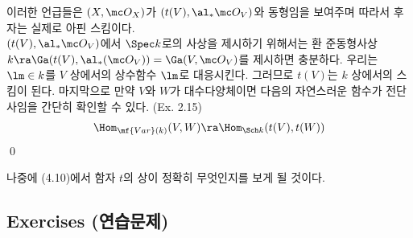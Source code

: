 \begin{proposition}
{		이러한 언급들은 $(X,\mc O_X)$가 $(t(V),\al_*\mc O_V)$와 동형임을 보여주며 따라서 후자는 실제로 아핀 스킴이다.\\
		$(t(V),\al_*\mc O_V)$에서 $\Spec k$로의 사상을 제시하기 위해서는 환 준동형사상
		$k\ra\Ga(t(V),\al_*(\mc O_V))=\Ga(V,\mc O_V)$를 제시하면 충분하다.
		우리는 $\lm\in k$를 $V$ 상에서의 상수함수 $\lm$로 대응시킨다. 그러므로 $t(V)$는 $k$ 상에서의 스킴이 된다.
		마지막으로 만약 $V$와 $W$가 대수다양체이면 다음의 자연스러운 함수가 전단사임을 간단히 확인할 수 있다. (Ex. 2.15)}
		$$\Hom_{\mf{Var}(k)}(V,W)\ra\Hom_{\Sch k}(t(V),t(W))$$
	\qed
	\end{proposition}
	
	 나중에 (4.10)에서 함자 $t$의 상이 정확히 무엇인지를 보게 될 것이다.
	
	
	\subsection*{Exercises (연습문제)}
	
